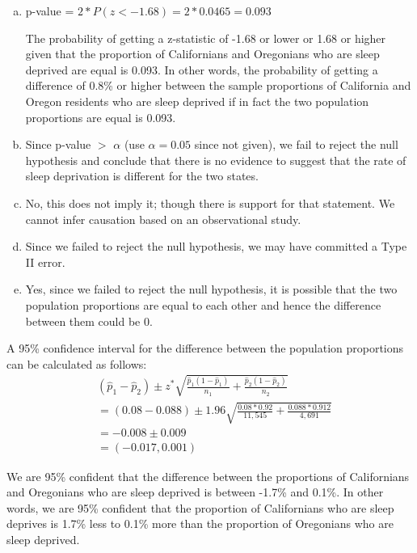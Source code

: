 {\begin{enumerate}[(a)]
\item p-value = $2 * P(z < -1.68) = 2 * 0.0465 = 0.093$

The probability of getting a z-statistic of -1.68 or lower or 1.68 or higher given that the proportion of Californians and Oregonians who are sleep deprived are equal is 0.093. In other words, the probability of getting a difference of 0.8\% or higher between the sample proportions of California and Oregon residents who are sleep deprived if in fact the two population proportions are equal is 0.093.

\item Since p-value $>$ $\alpha$ (use $\alpha = 0.05$ since not given), we fail to reject the null hypothesis and conclude that there is no evidence to suggest that the rate of sleep deprivation is different for the two states.

\item No, this does not imply it; though there is support for that statement. We cannot infer causation based on an observational study.

\item Since we failed to reject the null hypothesis, we may have committed a Type II error.

\item Yes, since we failed to reject the null hypothesis, it is possible that the two population proportions are equal to each other and hence the difference between them could be 0.

\end{enumerate}
}\label{OregonCaliSleepHT}

%

{ A 95\% confidence interval for the difference between the population proportions can be calculated as follows:
\begin{align*}
&(\hat{p}_1 - \hat{p}_2) \pm z^* \sqrt{ \frac{\hat{p}_1 (1 - \hat{p}_1)}{n_1} + \frac{\hat{p}_2 (1 - \hat{p}_2)}{n_2} } \\
&= (0.08 - 0.088) \pm 1.96 \sqrt{ \frac{0.08 * 0.92}{11,545} + \frac{0.088 * 0.912}{4,691} } \\
&= -0.008 \pm 0.009 \\
&= (-0.017, 0.001)
\end{align*}

We are 95\% confident that the difference between the proportions of Californians and Oregonians who are sleep deprived is between -1.7\% and 0.1\%. In other words, we are 95\% confident that the proportion of Californians who are sleep deprives is 1.7\% less to 0.1\% more than the proportion of Oregonians who are sleep deprived.
}\label{OregonCaliSleepCI}

